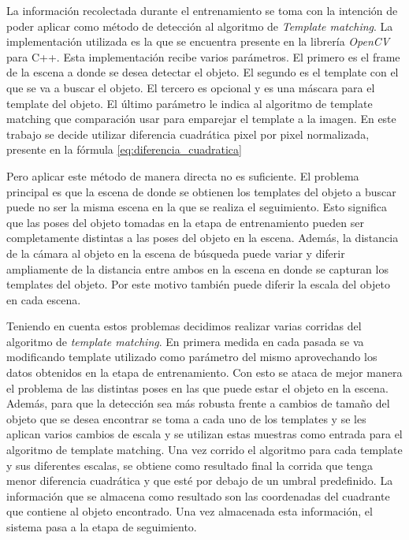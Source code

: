 
La información recolectada durante el entrenamiento se toma con la intención de poder aplicar como método de detección al algoritmo de \textit{Template matching}. La implementación utilizada es la que se encuentra presente en la librería \textit{OpenCV} para C++. Esta implementación recibe varios parámetros. El primero es el frame de la escena a donde se desea detectar el objeto. El segundo es el template con el que se va a buscar el objeto. El tercero es opcional y es una máscara para el template del objeto. El último parámetro le indica al algoritmo de template matching que comparación usar para emparejar el template a la imagen. En este trabajo se decide utilizar diferencia cuadrática pixel por pixel normalizada, presente en la fórmula \ref{eq:diferencia_cuadratica}

Pero aplicar este método de manera directa no es suficiente. El problema principal es que la escena de donde se obtienen los templates del objeto a buscar puede no ser la misma escena en la que se realiza el seguimiento. Esto significa que las poses del objeto tomadas en la etapa de entrenamiento pueden ser completamente distintas a las poses del objeto en la escena. Además, la distancia de la cámara al objeto en la escena de búsqueda puede variar y diferir ampliamente de la distancia entre ambos en la escena en donde se capturan los templates del objeto. Por este motivo también puede diferir la escala del objeto en cada escena.

Teniendo en cuenta estos problemas decidimos realizar varias corridas del algoritmo de \textit{template matching}. En primera medida en cada pasada se va modificando template utilizado como parámetro del mismo aprovechando los datos obtenidos en la etapa de entrenamiento. Con esto se ataca de mejor manera el problema de las distintas poses en las que puede estar el objeto en la escena. Además, para que la detección sea más robusta frente a cambios de tamaño del objeto que se desea encontrar se toma a cada uno de los templates y se les aplican varios cambios de escala y se utilizan estas muestras como entrada para el algoritmo de template matching. Una vez corrido el algoritmo para cada template y sus diferentes escalas, se obtiene como resultado final la corrida que tenga menor diferencia cuadrática y que esté por debajo de un umbral predefinido. La información que se almacena como resultado son las coordenadas del cuadrante que contiene al objeto encontrado. Una vez almacenada esta información, el sistema pasa a la etapa de seguimiento.

